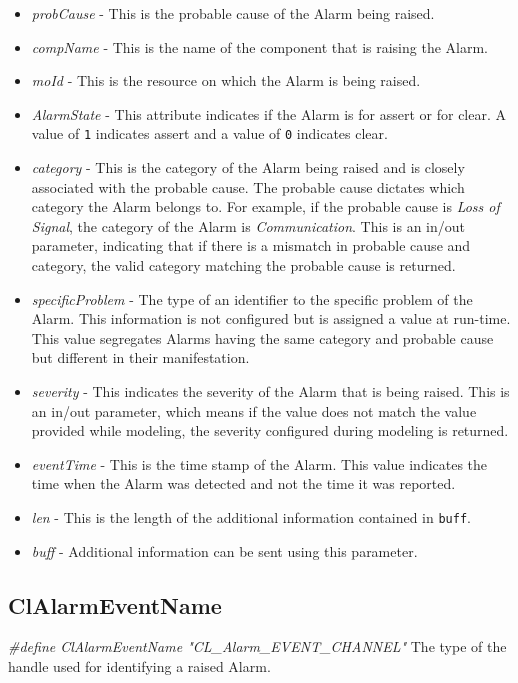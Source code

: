 \begin{flushleft}
\begin{itemize}
\item \textit{probCause} - This is the probable cause of the Alarm being raised.
\item \textit{compName} - This is the name of the component that is raising the Alarm.
\item \textit{moId} - This is the resource on which the Alarm is being raised. 
\item
\textit{AlarmState} - This attribute indicates if the Alarm is for assert or for clear. A value of {\tt{1}} indicates assert and a value of {\tt{0}}
indicates clear.
\item \textit{category} - This is the category of the Alarm being raised and is closely associated with the probable cause. The probable 
cause dictates which category the Alarm belongs to. For example, if the probable cause is \textit{Loss of Signal}, the category of the
Alarm is \textit{Communication}. This is an in/out parameter, indicating that if there is a mismatch in probable cause and category, the valid category
matching the probable cause is returned.
\item \textit{specificProblem} - The type of an identifier to the specific problem of the Alarm. This information is not configured but is assigned a 
value at run-time. This value segregates Alarms having the same category and probable cause but different in their manifestation. 
\item \textit{severity} - This indicates the severity of the Alarm that is being raised. This is an in/out parameter, which means if the value does not match the 
value provided while modeling, the severity configured during modeling is returned.
\item \textit{eventTime} - This is the time stamp of the Alarm. This value indicates the time when the Alarm was detected and not the time it was reported.
\item \textit{len} - This is the length of the additional information contained in {\tt{buff}}.
\item \textit{buff} - Additional information can be sent using this parameter.
\end{itemize}




\subsection{ClAlarmEventName}
\textit{\#define ClAlarmEventName "CL\_\-Alarm\_\-EVENT\_\-CHANNEL" }
\newline
\newline
The type of the handle used for identifying a raised Alarm.




\end{flushleft}
